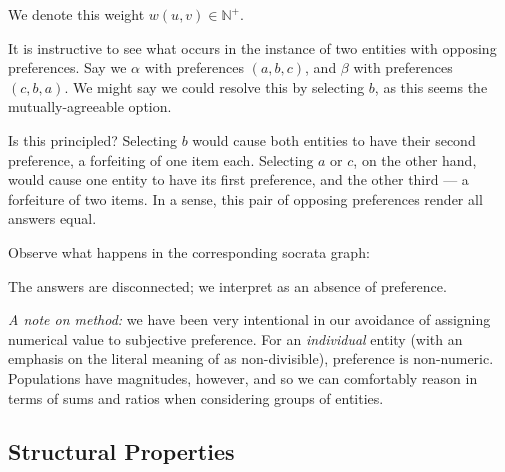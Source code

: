 \documentclass[12pt]{book}
\begin{document}
We denote this weight $w(u,v) \in \mathbb{N}^+$.

It is instructive to see what occurs in the instance of two entities with opposing preferences.
Say we $\alpha$ with preferences $(a, b, c)$, and $\beta$ with preferences $(c, b, a)$.
We might say we could resolve this by selecting $b$, as this seems the mutually-agreeable option.

Is this principled?
Selecting $b$ would cause both entities to have their second preference, a forfeiting of one item each.
Selecting $a$ or $c$, on the other hand, would cause one entity to have its first preference, and the other third --- a forfeiture of two items.
In a sense, this pair of opposing preferences render all answers equal.

Observe what happens in the corresponding socrata graph:

\begin{center}
\end{center}

\begin{center}
\end{center}

The answers are disconnected; we interpret as an absence of preference.

\bigskip

\textit{A note on method:} we have been very intentional in our avoidance of assigning numerical value to subjective preference.
For an \textit{individual} entity (with an emphasis on the literal meaning of  as non-divisible), preference is non-numeric.
Populations have magnitudes, however, and so we can comfortably reason in terms of sums and ratios when considering groups of entities.

\subsection{Structural Properties}
\end{document}
